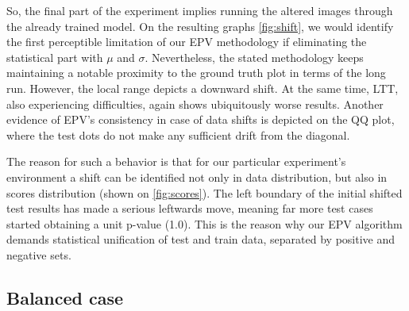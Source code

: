 \documentclass{article}
\begin{document}
So, the final part of the experiment implies running the altered images through the already trained model. On the resulting graphs \ref{fig:shift}, we would identify the first perceptible limitation of our EPV methodology if eliminating the statistical part with $\mu$ and $\sigma$. Nevertheless, the stated methodology keeps maintaining a notable proximity to the ground truth plot in terms of the long run. However, the local range depicts a downward shift. At the same time, LTT, also experiencing difficulties, again shows ubiquitously worse results. Another evidence of EPV's consistency in case of data shifts is depicted on the QQ plot, where the test dots do not make any sufficient drift from the diagonal. 

The reason for such a behavior is that for our particular experiment's environment a shift can be identified not only in data distribution, but also in scores distribution (shown on \ref{fig:scores}). The left boundary of the initial shifted test results has made a serious leftwards move, meaning far more test cases started obtaining a unit p-value (1.0). This is the reason why our EPV algorithm demands statistical unification of test and train data, separated by positive and negative sets.

\subsection{Balanced case}
\end{document}
